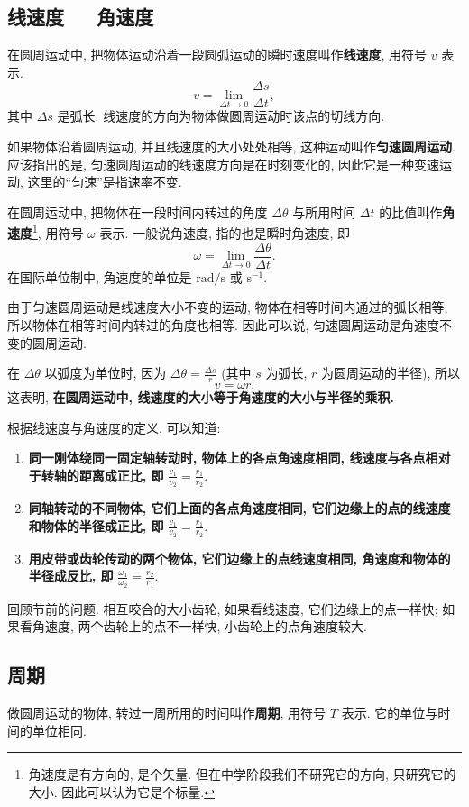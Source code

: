\documentclass[UTF8,openany,fontset=fandol]{ctexbook}
\theoremstyle{chinesetextbook}
\newcommand{\bre}{\ \ \ }
\begin{document}
\subsection{线速度\bre 角速度}
在圆周运动中, 把物体运动沿着一段圆弧运动的瞬时速度叫作\textbf{线速度}, 用符号 $v$ 表示.
\[
v=\lim_{\Delta t\rightarrow 0}\frac{\Delta{s}}{\Delta{t}},
\]
其中 $\Delta s$ 是弧长. 线速度的方向为物体做圆周运动时该点的切线方向.

如果物体沿着圆周运动, 并且线速度的大小处处相等, 这种运动叫作\textbf{匀速圆周运动}. 应该指出的是, 匀速圆周运动的线速度方向是在时刻变化的, 因此它是一种变速运动, 这里的“匀速”是指速率不变.

在圆周运动中, 把物体在一段时间内转过的角度 $\Delta{\theta}$ 与所用时间 $\Delta{t}$ 的比值叫作\textbf{角速度}\footnote{角速度是有方向的, 是个矢量. 但在中学阶段我们不研究它的方向, 只研究它的大小. 因此可以认为它是个标量.}, 用符号 $\omega$ 表示. 一般说角速度, 指的也是瞬时角速度, 即
\[
\omega=\lim_{\Delta t\rightarrow 0}\frac{\Delta{\theta}}{\Delta{t}}.
\]
在国际单位制中, 角速度的单位是 $\mathrm{rad/s}$ 或 $\mathrm{s^{-1}}$.

由于匀速圆周运动是线速度大小不变的运动, 物体在相等时间内通过的弧长相等, 所以物体在相等时间内转过的角度也相等. 因此可以说, 匀速圆周运动是角速度不变的圆周运动.

在 $\Delta\theta$ 以弧度为单位时, 因为 $\displaystyle\Delta\theta=\frac{\Delta s}{r}$ (其中 $s$ 为弧长, $r$ 为圆周运动的半径), 所以
\[
v=\omega r.
\]
这表明, \textbf{在圆周运动中, 线速度的大小等于角速度的大小与半径的乘积.}

根据线速度与角速度的定义, 可以知道:
\begin{enumerate}
\item \textbf{同一刚体绕同一固定轴转动时, 物体上的各点角速度相同, 线速度与各点相对于转轴的距离成正比, 即} $\displaystyle\frac{v_1}{v_2}=\frac{r_1}{r_2}.$
\item \textbf{同轴转动的不同物体, 它们上面的各点角速度相同, 它们边缘上的点的线速度和物体的半径成正比, 即} $\displaystyle\frac{v_1}{v_2}=\frac{r_1}{r_2}.$
\item \textbf{用皮带或齿轮传动的两个物体, 它们边缘上的点线速度相同, 角速度和物体的半径成反比, 即} $\displaystyle\frac{\omega_1}{\omega_2}=\frac{r_2}{r_1}.$
\end{enumerate}

回顾节前的问题. 相互咬合的大小齿轮, 如果看线速度, 它们边缘上的点一样快; 如果看角速度, 两个齿轮上的点不一样快, 小齿轮上的点角速度较大.
\subsection{周期}
做圆周运动的物体, 转过一周所用的时间叫作\textbf{周期}, 用符号 $T$ 表示. 它的单位与时间的单位相同.
\end{document}
